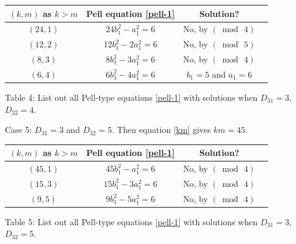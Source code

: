 \documentclass[12pt]{article}
\begin{document}
\begin{center}
\begin{tabular}{|c|c|c|c|}
\hline $(k, m)$ as $k > m$ & Pell equation \eqref{pell-1} & Solution? \\
\hline $(24,1)$ & $24b_1^2-a_1^2=6$ & No, by $(\bmod \, 4)$\\
\hline $(12,2)$ & $12b_1^2-2a_1^2=6$ & No, by $(\bmod \, 5)$\\
\hline $(8,3)$ & $8b_1^2-3a_1^2=6$ & No, by $(\bmod \, 4)$\\
\hline $(6,4)$ & $6b_1^2-4a_1^2=6$ & $b_1=5$ and $a_1=6$\\
\hline
\end{tabular}
\newline \small{Table 4: List out all Pell-type equations \eqref{pell-1} with solutions when $D_{31} = 3$, $D_{32} = 4$.}
\end{center}

Case 5: $D_{31} = 3$ and $D_{32} = 5$. Then equation \eqref{km} gives $k m = 45$.

\begin{center}
\begin{tabular}{|c|c|c|c|}
\hline $(k, m)$ as $k > m$ & Pell equation \eqref{pell-1} & Solution? \\
\hline $(45,1)$ & $45b_1^2-a_1^2=6$ & No, by $(\bmod \, 4)$\\
\hline $(15,3)$ & $15b_1^2-3a_1^2=6$ & No, by $(\bmod \, 4)$\\
\hline $(9,5)$ & $9b_1^2-5a_1^2=6$ & No, by $(\bmod \, 4)$\\
\hline
\end{tabular}
\newline \small{Table 5: List out all Pell-type equations \eqref{pell-1} with solutions when $D_{31} = 3$, $D_{32} = 5$.}
\end{center}

%
\end{document}
